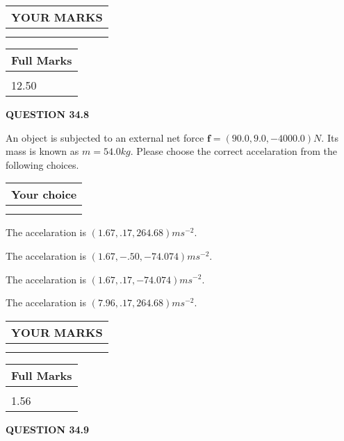 \documentclass[12pt]{article}
\begin{document}
 

 
\vspace{0.3in}
  
\vspace{0.2in}
  
\noindent\begin{tabular}{|l|}
\hline
 YOUR MARKS  \\
\hline
 \\ 
 \\ 
\hline
\end{tabular}
\hspace{0.05in} \begin{tabular}{|l|}
\hline
 Full Marks  \\
\hline
 \\ 
12.50 \\
\hline
\end{tabular}
{\textbf{\Large{QUESTION
34.8 
}}}
  
  
 
An object is subjected to an external net force $\mathbf{f}=
(90.0 , 9.0 , -4000.0) N$.
Its mass is known as $m= %
54.0 kg$.
Please choose the correct accelaration from the following choices.
  
  
\noindent\hspace{3.0in} \begin{tabular}{|l|}
\hline
Your choice \\
\hline
 \\ 
 \\ 
\hline
\end{tabular}
  
  
 
 
  The accelaration is $  %
(
1.67,
.17,
264.68)
ms^{-2} $.
 
 
  The accelaration is $  %
(
1.67,
-.50,
-74.074)
ms^{-2} $.
 
 
  The accelaration is $  %
(
1.67,
.17,
-74.074)
ms^{-2} $.
 
 
  The accelaration is $  %
(
7.96,
.17,
264.68)
ms^{-2} $.
 
 
 

 
 
\vspace{0.3in}
  
\vspace{0.2in}
  
\noindent\begin{tabular}{|l|}
\hline
 YOUR MARKS  \\
\hline
 \\ 
 \\ 
\hline
\end{tabular}
\hspace{0.05in} \begin{tabular}{|l|}
\hline
 Full Marks  \\
\hline
 \\ 
1.56 \\
\hline
\end{tabular}
{\textbf{\Large{QUESTION
34.9 
}}}
  
\end{document}
